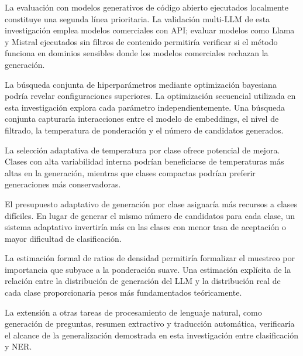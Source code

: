 La evaluación con modelos generativos de código abierto ejecutados localmente constituye una segunda línea prioritaria. La validación multi-LLM de esta investigación emplea modelos comerciales con API; evaluar modelos como Llama y Mistral ejecutados sin filtros de contenido permitiría verificar si el método funciona en dominios sensibles donde los modelos comerciales rechazan la generación.

La búsqueda conjunta de hiperparámetros mediante optimización bayesiana podría revelar configuraciones superiores. La optimización secuencial utilizada en esta investigación explora cada parámetro independientemente. Una búsqueda conjunta capturaría interacciones entre el modelo de embeddings, el nivel de filtrado, la temperatura de ponderación y el número de candidatos generados.

La selección adaptativa de temperatura por clase ofrece potencial de mejora. Clases con alta variabilidad interna podrían beneficiarse de temperaturas más altas en la generación, mientras que clases compactas podrían preferir generaciones más conservadoras.

El presupuesto adaptativo de generación por clase asignaría más recursos a clases difíciles. En lugar de generar el mismo número de candidatos para cada clase, un sistema adaptativo invertiría más en las clases con menor tasa de aceptación o mayor dificultad de clasificación.

La estimación formal de ratios de densidad permitiría formalizar el muestreo por importancia que subyace a la ponderación suave. Una estimación explícita de la relación entre la distribución de generación del LLM y la distribución real de cada clase proporcionaría pesos más fundamentados teóricamente.

La extensión a otras tareas de procesamiento de lenguaje natural, como generación de preguntas, resumen extractivo y traducción automática, verificaría el alcance de la generalización demostrada en esta investigación entre clasificación y NER.
